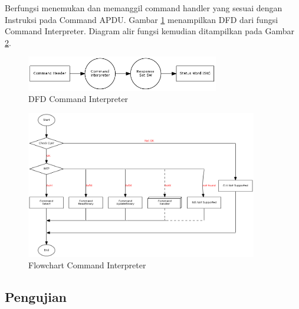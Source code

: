 Berfungsi menemukan dan memanggil command handler yang sesuai dengan Instruksi pada Command APDU. Gambar \ref{fig-dfd-cmdinterpreter} menampilkan DFD dari fungsi Command Interpreter. Diagram alir fungsi kemudian ditampilkan pada Gambar \ref{fig-flow-cmdinterpreter}. 

\begin{figure}[h]
\centering
\includegraphics[width=0.75\textwidth]{image/command/dfd_cmdinterpreter.png}
\caption{DFD Command Interpreter}
\label{fig-dfd-cmdinterpreter}
\end{figure}

\begin{figure}[h]
\centering
\includegraphics[width=0.9\textwidth, angle=90]{image/command/flow_cmdinterpreter.png}
\caption{Flowchart Command Interpreter}
\label{fig-flow-cmdinterpreter}
\end{figure}

\subsection {Pengujian}

